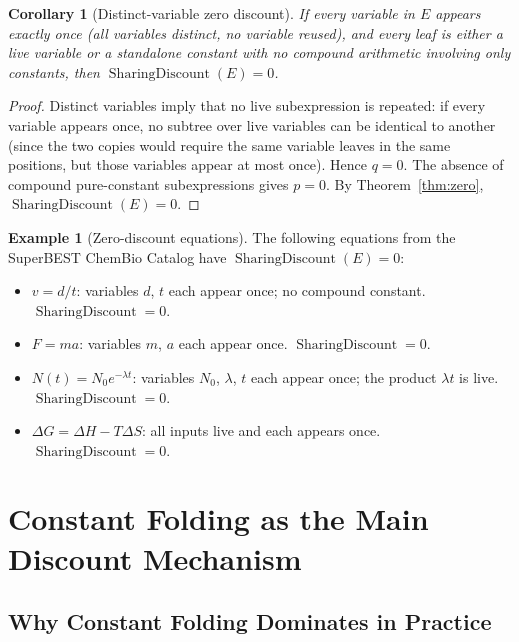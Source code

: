 \documentclass[12pt,a4paper]{article}
\newtheorem{corollary}[theorem]{Corollary}
\theoremstyle{definition}
\newtheorem{example}[theorem]{Example}
\newcommand{\SD}{\operatorname{SharingDiscount}}
\begin{document}
\begin{corollary}[Distinct-variable zero discount]
\label{cor:distinct}
If every variable in $E$ appears exactly once (all variables distinct, no
variable reused), and every leaf is either a live variable or a standalone
constant with no compound arithmetic involving only constants, then
$\SD(E) = 0$.
\end{corollary}

\begin{proof}
Distinct variables imply that no live subexpression is repeated: if every
variable appears once, no subtree over live variables can be identical to
another (since the two copies would require the same variable leaves in
the same positions, but those variables appear at most once).  Hence
$q = 0$.  The absence of compound pure-constant subexpressions gives
$p = 0$.  By Theorem~\ref{thm:zero}, $\SD(E) = 0$.
\end{proof}

\begin{example}[Zero-discount equations]
The following equations from the SuperBEST ChemBio Catalog have
$\SD(E) = 0$:
\begin{itemize}[nosep]
  \item $v = d/t$: variables $d$, $t$ each appear once; no compound constant.
        $\SD = 0$.
  \item $F = ma$: variables $m$, $a$ each appear once.  $\SD = 0$.
  \item $N(t) = N_0 e^{-\lambda t}$: variables $N_0$, $\lambda$, $t$ each
        appear once; the product $\lambda t$ is live.  $\SD = 0$.
  \item $\Delta G = \Delta H - T \Delta S$: all inputs live and each
        appears once.  $\SD = 0$.
\end{itemize}
\end{example}

\section{Constant Folding as the Main Discount Mechanism}
\label{sec:cfold}

\subsection{Why Constant Folding Dominates in Practice}
\end{document}
